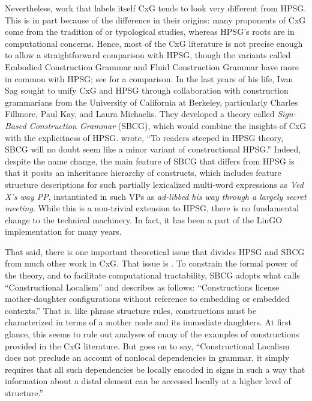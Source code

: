 \documentclass[output=paper]{langsci/langscibook}
\begin{document}
Nevertheless, work that labels itself CxG tends to look very different from HPSG.  This is in part because of the difference in their origins: many proponents of CxG come from the tradition of  or typological studies, whereas HPSG's roots are in computational concerns. Hence, most of the CxG literature is not precise enough to allow a straightforward comparison with HPSG, though the variants called Embodied Construction Grammar and Fluid Construction Grammar have more in common with HPSG; see \citet{MuellerFCG} for a comparison.  In the last years of his life, Ivan Sag sought to unify CxG and HPSG through collaboration with construction grammarians from the University of California at Berkeley, particularly Charles Fillmore, Paul Kay, and Laura Michaelis.  They developed a theory called \emph{Sign-Based Construction Grammar} (SBCG), which would combine the insights of CxG with the explicitness of HPSG.  \citet[]{Sag2012a} wrote, ``To readers steeped in HPSG theory, SBCG will no doubt seem like a minor variant of constructional HPSG.''  Indeed, despite the name change, the main feature of SBCG that differs from HPSG is that it posits an inheritance hierarchy of constructs, which includes feature structure descriptions for such partially lexicalized multi-word expressions as \emph{Ved X's way PP}, instantiated in such VPs as \textit{ad-libbed his way through a largely secret meeting}.  While this is a non-trivial extension to HPSG, there is no fundamental change to the technical machinery.  In fact, it has been a part of the LinGO implementation for many years.

That said, there is one important theoretical issue that divides HPSG and SBCG from much other work in CxG.  That issue is .  To constrain the formal power of the theory, and to facilitate computational tractability, SBCG adopts what \citet[]{Sag2012a} calls ``Constructional Localism'' and describes as follows:  ``Constructions license mother-daughter configurations without reference to embedding or embedded contexts.''  That is. like phrase structure rules, constructions must be characterized in terms of a mother node and its immediate daughters.  At first glance, this seems to rule out analyses of many of the examples of constructions provided in the CxG literature.  But  \citet[]{Sag2012a} goes on to say, ``Constructional Localism does not preclude an account of nonlocal dependencies in grammar, it simply requires that all such dependencies be locally encoded in signs in such a way that information about a distal element can be accessed locally at a higher level of structure.''
\end{document}
